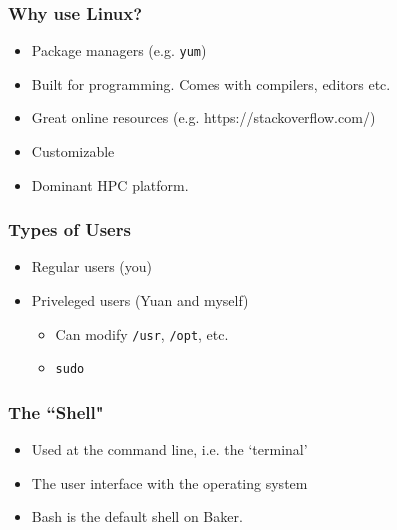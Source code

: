 \documentclass{beamer}
\newcommand{\code}[1]{\colorbox{codegray}{\texttt{#1}}}
\begin{document}
\begin{frame}
\frametitle{Why use Linux?}
\begin{itemize}
    \item Package managers (e.g. \code{yum})
    \bigskip
    \item Built for programming. Comes with compilers, editors etc.
    \bigskip
    \item Great online resources (e.g. https://stackoverflow.com/)
    \bigskip
    \item Customizable
    \bigskip
    \item Dominant HPC platform.
\end{itemize}
\end{frame}
 

\begin{frame}
\frametitle{Types of Users}
\begin{itemize}
    \item Regular users (you)
    \bigskip

    \item Priveleged users (Yuan and myself)
    \bigskip

    \begin{itemize}
        \item Can modify \code{/usr}, \code{/opt}, etc.
        \bigskip

        \item \code{sudo}
    \end{itemize}
\end{itemize}
\end{frame}


\begin{frame}
\frametitle{The ``Shell"}
    \begin{itemize}
        \item Used at the command line, i.e. the `terminal'
        \bigskip
        \item The user interface with the operating system
        \bigskip
        \item Bash is the default shell on Baker.
    \end{itemize}
\end{frame}
\end{document}
